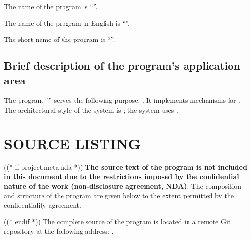 \documentclass[12pt,a4paper]{extarticle}
\begin{document}
The name of the program is \enquote{\projectname}.

The name of the program in English is \enquote{\hseProjectNameEn}.

The short name of the program is \enquote{\hseProjectNameShort}.

\subsection{Brief description of the program's application area}

The program \enquote{\projectname} serves the following purpose: . It implements mechanisms for . The architectural style of the system is ; the system uses .

\clearpage

\section{SOURCE LISTING}

((* if project.meta.nda *))
\textbf{The source text of the program is not included in this document
due to the restrictions imposed by the confidential nature of the work
(non-disclosure agreement, NDA).} The composition and structure of the
program are given below to the extent permitted by the confidentiality
agreement.

((* endif *))
The complete source of the program is located in a remote Git repository at the following address: . 
\end{document}
